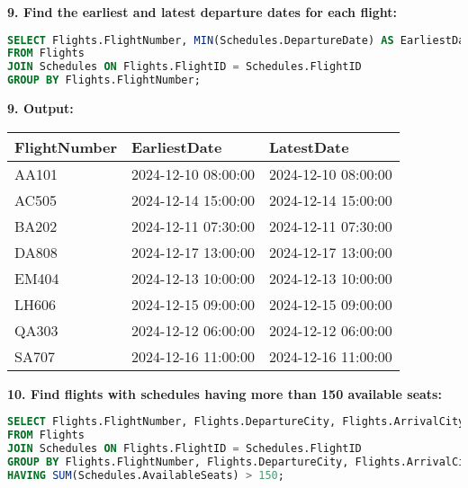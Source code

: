 \documentclass[14pt,a4paper]{extarticle}
\begin{document}
    \textbf{9. Find the earliest and latest departure dates for each flight:}
    \begin{lstlisting}[language=SQL, upquote=true]
SELECT Flights.FlightNumber, MIN(Schedules.DepartureDate) AS EarliestDate, MAX(Schedules.DepartureDate) AS LatestDate
FROM Flights
JOIN Schedules ON Flights.FlightID = Schedules.FlightID
GROUP BY Flights.FlightNumber;
    \end{lstlisting}
    
    \textbf{9. Output:}
\begin{table}[h!]
\centering
\begin{tabular}{|l|l|l|}
\hline
\textbf{FlightNumber} & \textbf{EarliestDate}       & \textbf{LatestDate}        \\ \hline
AA101                 & 2024-12-10 08:00:00        & 2024-12-10 08:00:00        \\ \hline
AC505                 & 2024-12-14 15:00:00        & 2024-12-14 15:00:00        \\ \hline
BA202                 & 2024-12-11 07:30:00        & 2024-12-11 07:30:00        \\ \hline
DA808                 & 2024-12-17 13:00:00        & 2024-12-17 13:00:00        \\ \hline
EM404                 & 2024-12-13 10:00:00        & 2024-12-13 10:00:00        \\ \hline
LH606                 & 2024-12-15 09:00:00        & 2024-12-15 09:00:00        \\ \hline
QA303                 & 2024-12-12 06:00:00        & 2024-12-12 06:00:00        \\ \hline
SA707                 & 2024-12-16 11:00:00        & 2024-12-16 11:00:00        \\ \hline
\end{tabular}
\end{table}

    \textbf{10. Find flights with schedules having more than 150 available seats:}
    \begin{lstlisting}[language=SQL, upquote=true]
SELECT Flights.FlightNumber, Flights.DepartureCity, Flights.ArrivalCity, SUM(Schedules.AvailableSeats) AS TotalAvailableSeats
FROM Flights
JOIN Schedules ON Flights.FlightID = Schedules.FlightID
GROUP BY Flights.FlightNumber, Flights.DepartureCity, Flights.ArrivalCity
HAVING SUM(Schedules.AvailableSeats) > 150;
    \end{lstlisting}
    
\end{document}
